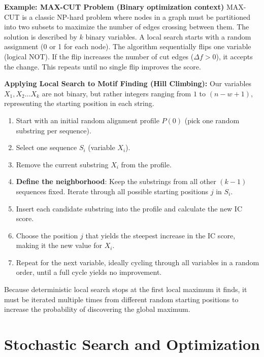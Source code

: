 \documentclass[11pt, a4paper]{article}
\begin{document}
\textbf{Example: MAX-CUT Problem (Binary optimization context)}
MAX-CUT is a classic NP-hard problem where nodes in a graph must be partitioned into two subsets to maximize the number of edges crossing between them. The solution is described by $k$ binary variables. A local search starts with a random assignment (0 or 1 for each node). The algorithm sequentially flips one variable (logical NOT). If the flip increases the number of cut edges ($\Delta f > 0$), it accepts the change. This repeats until no single flip improves the score.

\textbf{Applying Local Search to Motif Finding (Hill Climbing):}
Our variables $X_1, X_2 \dots X_k$ are not binary, but rather integers ranging from $1$ to $(n-w+1)$, representing the starting position in each string.
\begin{enumerate}
    \item Start with an initial random alignment profile $P(0)$ (pick one random substring per sequence).
    \item Select one sequence $S_i$ (variable $X_i$).
    \item Remove the current substring $X_i$ from the profile.
    \item \textbf{Define the neighborhood}: Keep the substrings from all other $(k-1)$ sequences fixed. Iterate through all possible starting positions $j$ in $S_i$.
    \item Insert each candidate substring into the profile and calculate the new IC score.
    \item Choose the position $j$ that yields the steepest increase in the IC score, making it the new value for $X_i$.
    \item Repeat for the next variable, ideally cycling through all variables in a random order, until a full cycle yields no improvement.
\end{enumerate}


Because deterministic local search stops at the first local maximum it finds, it must be iterated multiple times from different random starting positions to increase the probability of discovering the global maximum.

\section{Stochastic Search and Optimization}
\end{document}

